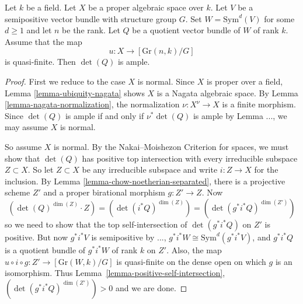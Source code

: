 \begin{lemma}
Let $k$ be a field.
Let $X$ be a proper algebraic space over $k$.
Let $V$ be a semipositive vector bundle with structure group $G$.
Set $W = \mathrm{Sym}^d(V)$ for some $d \geq 1$ and let $n$ be the rank.
Let $Q$ be a quotient vector bundle of $W$ of rank $k$.
Assume that the map
$$
u : X \to [\mathrm{Gr}(n,k)/G]
$$
is quasi-finite.
Then $\det(Q)$ is ample.
\end{lemma}

\begin{proof}
First we reduce to the case $X$ is normal.
Since $X$ is proper over a field, Lemma \ref{lemma-ubiquity-nagata} shows $X$
is a Nagata algebraic space.
By Lemma \ref{lemma-nagata-normalization}, the normalization
$\nu : X^\nu \to X$ is a finite morphism.
Since $\det(Q)$ is ample if and only if $\nu^*\det(Q)$ is ample by
Lemma ..., we may
assume $X$ is normal.

So assume $X$ is normal.
By the Nakai--Moishezon Criterion for spaces,
we must show that $\det(Q)$ has positive top intersection with
every irreducible subspace $Z \subset X$.
So let $Z \subset X$ be any irreducible subspace and write $i : Z \to X$ for
the inclusion.
By Lemma \ref{lemma-chow-noetherian-separated}, there is a projective
scheme $Z'$ and a proper birational morphism $g : Z' \to Z$.
Now
$$
  (\det(Q)^{\dim(Z)} \cdot Z)
    = (\det(i^*Q)^{\dim(Z)})
    = (\det(g^*i^*Q)^{\dim(Z')})
$$
so we need to show that the top self-intersection of $\det(g^*i^*Q)$ on $Z'$
is positive.
But now $g^*i^*V$ is semipositive by ...,
$g^*i^*W \cong \mathrm{Sym}^d(g^*i^*V)$, and $g^*i^*Q$ is a
quotient bundle of $g^*i^*W$ of rank $k$ on $Z'$.
Also, the map $u \circ i \circ g : Z' \to [\mathrm{Gr}(W,k)/G]$ is quasi-finite
on the dense open on which $g$ is an isomorphism.
Thus Lemma~\ref{lemma-positive-self-intersection},
$(\det(g^*i^*Q)^{\dim(Z')}) > 0$ and we are done.
\end{proof}





